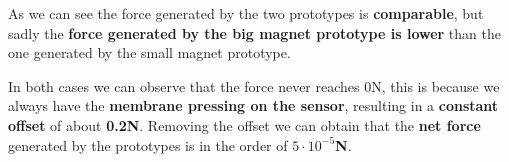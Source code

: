 As we can see the force generated by the two prototypes is \textbf{comparable}, but sadly the \textbf{force generated by the big magnet prototype is lower} than the one generated by the small magnet prototype.

In both cases we can observe that the force never reaches 0N, this is because we always have the \textbf{membrane pressing on the sensor}, resulting in a \textbf{constant offset} of about \textbf{0.2N}.
Removing the offset we can obtain that the \textbf{net force} generated by the prototypes is in the order of \textbf{$5\cdot10^{-5}$N}.